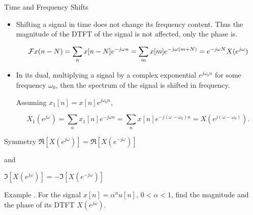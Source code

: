 \documentclass[aspectratio=169,xcolor=dvipsnames,svgnames,x11names,fleqn]{beamer}
\begin{document}
\begin{frame}{Time and Frequency Shifts}

\begin{itemize}
    \item Shifting a signal in time does not change its frequency content. Thus the magnitude of the DTFT of the signal is not affected, only the phase is.

    $$
    {\mathcal F}{x(n-N)}  = \sum_{n}x[n-N]e^{-j\omega n} = \sum_{m} x[m]e^{-j \omega(m + N)} = e^{-j\omega N} X(e^{j\omega})
    $$

    \item In its dual, multiplying a signal by a complex exponential $e^{j\omega_0 n}$ for some frequency $\omega_0$, then the spectrum of the signal is shifted in frequency. 

    Assuming $x_1[n] = x[n]e^{j\omega_0 n}$,

    $$
    X_1(e^{j\omega}) = \sum_n x_1[n]e^{-j\omega n} = \sum_n x[n] e^{-j(\omega - \omega_0)n} = X(e^{j(\omega - \omega_0)}).
    $$
\end{itemize}
    
\end{frame}

\begin{frame}{Symmetry}
    $\Re[X(e^{j\omega})] = \Re[X(e^{-j\omega})]$

    and

    $\Im[X(e^{j\omega})] = -\Im[X(e^{-j\omega})]$
\end{frame}

\begin{frame}{Example}
. For the signal $x[n] = \alpha^nu[n]$, $0 <\alpha< 1$, find the magnitude and the phase of its DTFT $X(e^{j\omega})$.
    
\end{frame}

    \begin{frame}{}
\vspace*{-9\baselineskip}
    \color{LightGray}{Blank space for calculation}
\end{frame}
\begin{frame}{}
\vspace*{-9\baselineskip}
    \color{LightGray}{Blank space for calculation}
\end{frame}
\begin{frame}{}
\vspace*{-9\baselineskip}
    \color{LightGray}{Blank space for calculation}
\end{frame}
\end{document}
